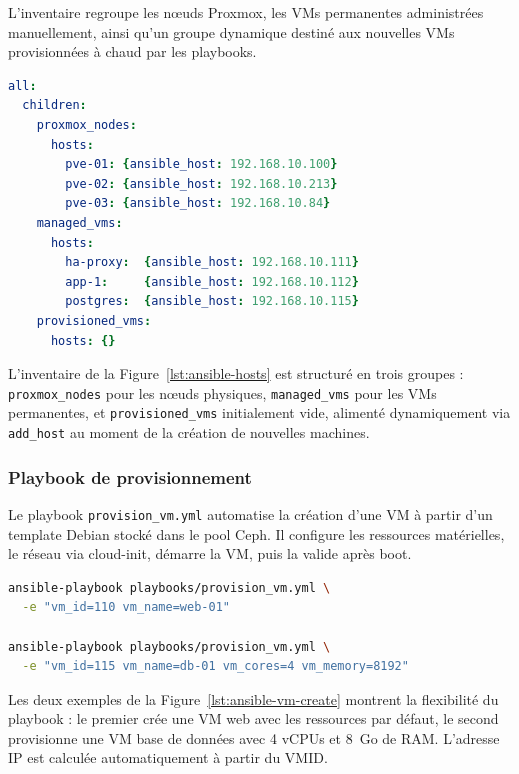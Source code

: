 \par L'inventaire regroupe les nœuds Proxmox, les VMs permanentes administrées manuellement, ainsi qu'un groupe dynamique destiné
aux nouvelles VMs provisionnées à chaud par les playbooks.\\

\begin{lstlisting}[style=sonacode,language=yaml,caption={Extrait de l'inventaire hosts.yml},label={lst:ansible-hosts}]
all:
  children:
    proxmox_nodes:
      hosts:
        pve-01: {ansible_host: 192.168.10.100}
        pve-02: {ansible_host: 192.168.10.213}
        pve-03: {ansible_host: 192.168.10.84}
    managed_vms:
      hosts:
        ha-proxy:  {ansible_host: 192.168.10.111}
        app-1:     {ansible_host: 192.168.10.112}
        postgres:  {ansible_host: 192.168.10.115}
    provisioned_vms:
      hosts: {}
\end{lstlisting}

\par L'inventaire de la Figure~\ref{lst:ansible-hosts} est structuré en trois groupes : \texttt{proxmox\_nodes} pour les nœuds physiques, \texttt{managed\_vms} pour les
VMs permanentes, et \texttt{provisioned\_vms} initialement vide, alimenté dynamiquement via \texttt{add\_host} au moment de la
création de nouvelles machines.\\

\subsubsection{Playbook de provisionnement}

\par Le playbook \texttt{provision\_vm.yml} automatise la création d'une VM à partir d'un template Debian stocké dans le pool Ceph.
Il configure les ressources matérielles, le réseau via cloud-init, démarre la VM, puis la valide après boot.\\

\begin{lstlisting}[style=sonacode,language=bash,caption={Exemples d'utilisation du playbook
provision\_vm.yml},label={lst:ansible-vm-create}]
ansible-playbook playbooks/provision_vm.yml \
  -e "vm_id=110 vm_name=web-01"

ansible-playbook playbooks/provision_vm.yml \
  -e "vm_id=115 vm_name=db-01 vm_cores=4 vm_memory=8192"
\end{lstlisting}

\par Les deux exemples de la Figure~\ref{lst:ansible-vm-create} montrent la flexibilité du playbook : le premier crée une VM web avec les ressources par défaut, le second
provisionne une VM base de données avec 4 vCPUs et 8~Go de RAM. L'adresse IP est calculée automatiquement à partir du VMID.\\

